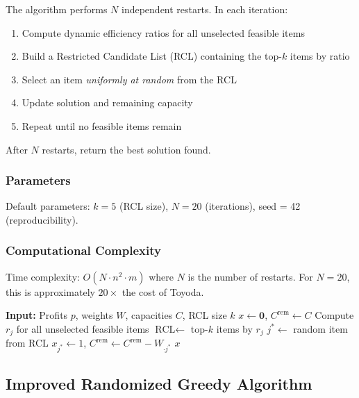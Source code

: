\documentclass[12pt,a4paper]{article}
\begin{document}
The algorithm performs $N$ independent restarts. In each iteration:
\begin{enumerate}
    \item Compute dynamic efficiency ratios for all unselected feasible items
    \item Build a Restricted Candidate List (RCL) containing the top-$k$ items by ratio
    \item Select an item \emph{uniformly at random} from the RCL
    \item Update solution and remaining capacity
    \item Repeat until no feasible items remain
\end{enumerate}

After $N$ restarts, return the best solution found.

\subsubsection{Parameters}

Default parameters: $k = 5$ (RCL size), $N = 20$ (iterations), seed = 42 (reproducibility).

\subsubsection{Computational Complexity}

Time complexity: $O(N \cdot n^2 \cdot m)$ where $N$ is the number of restarts. For $N = 20$, this is approximately $20\times$ the cost of Toyoda.

\begin{algorithm}[H]
\caption{Randomized Greedy (single restart)}
\begin{algorithmic}[1]
\State \textbf{Input:} Profits $p$, weights $W$, capacities $C$, RCL size $k$
\State $x \gets \mathbf{0}$, $C^{\text{rem}} \gets C$
    \State Compute $r_j$ for all unselected feasible items
    \State $\text{RCL} \gets$ top-$k$ items by $r_j$
    \State $j^* \gets$ random item from RCL
    \State $x_{j^*} \gets 1$, $C^{\text{rem}} \gets C^{\text{rem}} - W_{\cdot j^*}$
\EndWhile
\State \Return $x$
\end{algorithmic}
\end{algorithm}

\subsection{Improved Randomized Greedy Algorithm}
\end{document}
